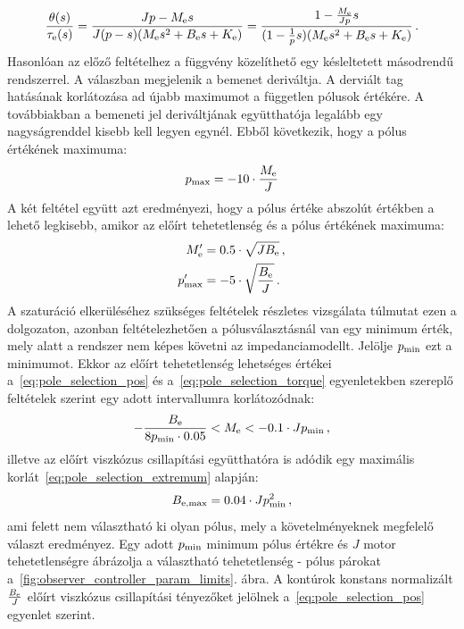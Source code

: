 \begin{align}
    \frac{\theta(s)}{\tau_{\mathrm{e}} (s)} = 
    \frac{Jp - M_{\mathrm{e}} s}{J(p-s)(M_{\mathrm{e}} s^2 + B_{\mathrm{e}} s + K_{\mathrm{e}})} = 
    \frac{1 -\frac{M_{\mathrm{e}}}{Jp} s}{(1-\frac{1}{p}s)(M_{\mathrm{e}} s^2 + B_{\mathrm{e}} s + K_{\mathrm{e}})}\,.
\end{align}
Hasonlóan az előző feltételhez a függvény közelíthető egy késleltetett másodrendű rendszerrel. A válaszban 
megjelenik a bemenet deriváltja. A derviált tag hatásának korlátozása ad újabb maximumot a független pólusok értékére. A 
továbbiakban a bemeneti jel deriváltjának együtthatója legalább egy nagyságrenddel kisebb kell legyen egynél.
Ebből következik, hogy a pólus értékének maximuma:
\begin{align}\label{eq:pole_selection_torque}
    p_{\mathrm{max}} = -10 \cdot \frac{M_{\mathrm{e}}}{J}
\end{align}
A két feltétel együtt azt eredményezi, hogy a pólus értéke abszolút értékben a lehető legkisebb, amikor
az előírt tehetetlenség és a pólus értékének maximuma:
\begin{equation}\label{eq:pole_selection_extremum}
    \begin{split}
        M'_{\mathrm{e}} &= 0.5 \cdot \sqrt{JB_{\mathrm{e}}}\,, \\
        p'_{\mathrm{max}} &= -5 \cdot \sqrt{\frac{B_{\mathrm{e}}}{J}}\,.
    \end{split}
\end{equation}
A szaturáció elkerüléséhez szükséges feltételek részletes vizsgálata túlmutat ezen a dolgozaton, azonban feltételezhetően 
a pólusválasztásnál van egy minimum érték, mely alatt a rendszer nem képes követni az impedanciamodellt. Jelölje \(p_{\mathrm{min}}\) ezt a 
minimumot. Ekkor az előírt tehetetlenség lehetséges értékei a~\eqref{eq:pole_selection_pos} és a~\eqref{eq:pole_selection_torque} 
egyenletekben szereplő feltételek szerint egy adott intervallumra korlátozódnak:
\begin{align}
    -\frac{B_{\mathrm{e}}}{8p_{\mathrm{min}} \cdot 0.05} < M_{\mathrm{e}} < -0.1 \cdot Jp_{\mathrm{min}}\,,
\end{align}
illetve az előírt viszkózus csillapítási együtthatóra is adódik egy maximális korlát~\eqref{eq:pole_selection_extremum} alapján:
\begin{align}
    B_{\mathrm{e,max}} = 0.04 \cdot Jp^2_{\mathrm{min}}\,,
\end{align}
ami felett nem választható ki olyan pólus, mely a követelményeknek megfelelő választ eredményez. 
Egy adott \(p_{\mathrm{min}}\) minimum pólus értékre és \(J\) motor tehetetlenségre ábrázolja 
a választható tehetetlenség - pólus párokat a~\ref{fig:observer_controller_param_limits}. ábra.
A kontúrok konstans normalizált \(\frac{B_{\mathrm{e}}}{J}\) előírt viszkózus csillapítási tényezőket jelölnek a~\eqref{eq:pole_selection_pos}
egyenlet szerint.

